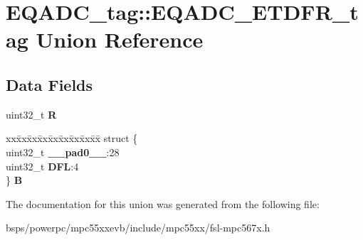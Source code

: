 \hypertarget{unionEQADC__tag_1_1EQADC__ETDFR__tag}{}\section{E\+Q\+A\+D\+C\+\_\+tag\+::E\+Q\+A\+D\+C\+\_\+\+E\+T\+D\+F\+R\+\_\+tag Union Reference}
\label{unionEQADC__tag_1_1EQADC__ETDFR__tag}
\subsection*{Data Fields}
\begin{DoxyCompactItemize}
\item 
\mbox{\label{unionEQADC__tag_1_1EQADC__ETDFR__tag_a01e0960dddb07fc176cbd370a91bdb8c}} 
uint32\+\_\+t {\bfseries R}
\item 
\mbox{\label{unionEQADC__tag_1_1EQADC__ETDFR__tag_ae2b43d3473a239cd8fb4169a6abc3b74}} 
\begin{tabbing}
xx\=xx\=xx\=xx\=xx\=xx\=xx\=xx\=xx\=\kill
struct \{\\
\>uint32\_t {\bfseries \_\_pad0\_\_}:28\\
\>uint32\_t {\bfseries DFL}:4\\
\} {\bfseries B}\\

\end{tabbing}\end{DoxyCompactItemize}


The documentation for this union was generated from the following file\+:\begin{DoxyCompactItemize}
\item 
bsps/powerpc/mpc55xxevb/include/mpc55xx/fsl-\/mpc567x.\+h\end{DoxyCompactItemize}
